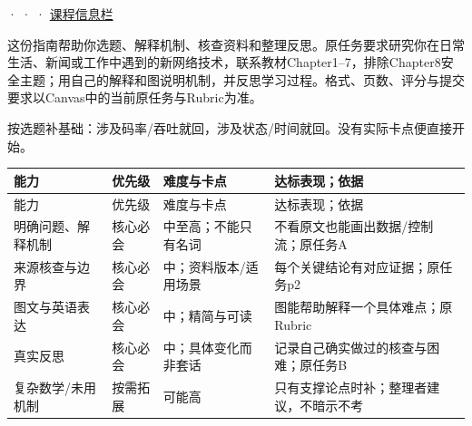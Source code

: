 


 ·  ·  · \href{https://crazyshout.github.io/micro-course/notices.html}{课程信息栏}


这份指南帮助你选题、解释机制、核查资料和整理反思。原任务要求研究你在日常生活、新闻或工作中遇到的新网络技术，联系教材Chapter1–7，排除Chapter8安全主题；用自己的解释和图说明机制，并反思学习过程。格式、页数、评分与提交要求以Canvas中的当前原任务与Rubric为准。


按选题补基础：涉及码率/吞吐就回，涉及状态/时间就回。没有实际卡点便直接开始。


\begingroup
\small\setlength{\tabcolsep}{3pt}
\renewcommand{\arraystretch}{1.22}
\begin{longtable}{@{}>{\raggedright\arraybackslash}p{}>{\raggedright\arraybackslash}p{}>{\raggedright\arraybackslash}p{}>{\raggedright\arraybackslash}p{}@{}}
\toprule
能力 & 优先级 & 难度与卡点 & 达标表现；依据 \\
\midrule\endfirsthead
能力 & 优先级 & 难度与卡点 & 达标表现；依据 \\
\midrule\endhead
\bottomrule\endfoot
明确问题、解释机制 & 核心必会 & 中至高；不能只有名词 & 不看原文也能画出数据/控制流；原任务A \\
来源核查与边界 & 核心必会 & 中；资料版本/适用场景 & 每个关键结论有对应证据；原任务p2 \\
图文与英语表达 & 核心必会 & 中；精简与可读 & 图能帮助解释一个具体难点；原Rubric \\
真实反思 & 核心必会 & 中；具体变化而非套话 & 记录自己确实做过的核查与困难；原任务B \\
复杂数学/未用机制 & 按需拓展 & 可能高 & 只有支撑论点时补；整理者建议，不暗示不考 \\
\end{longtable}
\endgroup



